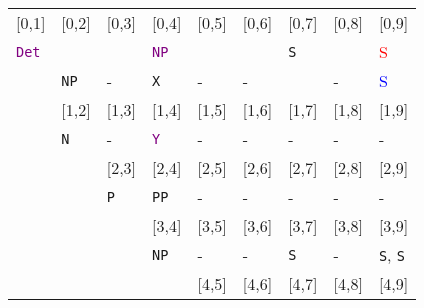 \documentclass[a4paper]{article}
\begin{document}
\begin{enumerate}
\begin{enumerate}
\begin{enumerate}
\begin{itemize}
\begin{table}[ht]
\begin{tabular}{ccccccccc}
\hline
\multicolumn{1}{|l|}{[0,1]} & \multicolumn{1}{l|}{[0,2]} & \multicolumn{1}{l|}{[0,3]} & \multicolumn{1}{l|}{[0,4]} & \multicolumn{1}{l|}{[0,5]} & \multicolumn{1}{l|}{[0,6]} & \multicolumn{1}{l|}{[0,7]} & \multicolumn{1}{l|}{[0,8]} & \multicolumn{1}{l|}{[0,9]} \\
\multicolumn{1}{|l|}{\textcolor{purple}{\texttt{Det}}} & \multicolumn{1}{l|}{} & \multicolumn{1}{l|}{} & \multicolumn{1}{l|}{\textcolor{purple}{\texttt{NP}}} & \multicolumn{1}{l|}{} & \multicolumn{1}{l|}{} & \multicolumn{1}{l|}{\texttt{S}} & \multicolumn{1}{l|}{} & \multicolumn{1}{l|}{\textcolor{red}{S}} \\
\multicolumn{1}{|l|}{} & \multicolumn{1}{l|}{\texttt{NP}} & \multicolumn{1}{l|}{-} & \multicolumn{1}{l|}{\texttt{X}} & \multicolumn{1}{l|}{-} & \multicolumn{1}{l|}{-} & \multicolumn{1}{l|}{} & \multicolumn{1}{l|}{-} & \multicolumn{1}{l|}{\textcolor{blue}{S}} \\
\hline
 & \multicolumn{1}{|l|}{[1,2]} & \multicolumn{1}{l|}{[1,3]} & \multicolumn{1}{l|}{[1,4]} & \multicolumn{1}{l|}{[1,5]} & \multicolumn{1}{l|}{[1,6]} & \multicolumn{1}{l|}{[1,7]} & \multicolumn{1}{l|}{[1,8]} & \multicolumn{1}{l|}{[1,9]} \\
 & \multicolumn{1}{|l|}{\texttt{N}} & \multicolumn{1}{l|}{-} & \multicolumn{1}{l|}{\textcolor{purple}{\texttt{Y}}} & \multicolumn{1}{l|}{-} & \multicolumn{1}{l|}{-} & \multicolumn{1}{l|}{-} & \multicolumn{1}{l|}{-} & \multicolumn{1}{l|}{-} \\
\cline{2-9}
 & & \multicolumn{1}{|l|}{[2,3]} & \multicolumn{1}{l|}{[2,4]} & \multicolumn{1}{l|}{[2,5]} & \multicolumn{1}{l|}{[2,6]} & \multicolumn{1}{l|}{[2,7]} & \multicolumn{1}{l|}{[2,8]} & \multicolumn{1}{l|}{[2,9]} \\
 & & \multicolumn{1}{|l|}{\texttt{P}} & \multicolumn{1}{l|}{\texttt{PP}} & \multicolumn{1}{l|}{-} & \multicolumn{1}{l|}{-} & \multicolumn{1}{l|}{-} & \multicolumn{1}{l|}{-} & \multicolumn{1}{l|}{-} \\
\cline{3-9}
 & & & \multicolumn{1}{|l|}{[3,4]} & \multicolumn{1}{l|}{[3,5]} & \multicolumn{1}{l|}{[3,6]} & \multicolumn{1}{l|}{[3,7]} & \multicolumn{1}{l|}{[3,8]} & \multicolumn{1}{l|}{[3,9]} \\
 & & & \multicolumn{1}{|l|}{\texttt{NP}} & \multicolumn{1}{l|}{-} & \multicolumn{1}{l|}{-} & \multicolumn{1}{l|}{\texttt{S}} & \multicolumn{1}{l|}{-} & \multicolumn{1}{l|}{\texttt{S}, \texttt{S}} \\
\cline{4-9}
 & & & & \multicolumn{1}{|l|}{[4,5]} & \multicolumn{1}{l|}{[4,6]} & \multicolumn{1}{l|}{[4,7]} & \multicolumn{1}{l|}{[4,8]} & \multicolumn{1}{l|}{[4,9]} \\

\end{tabular}
\end{table}
\end{itemize}
\end{enumerate}
\end{enumerate}
\end{enumerate}
\end{document}
